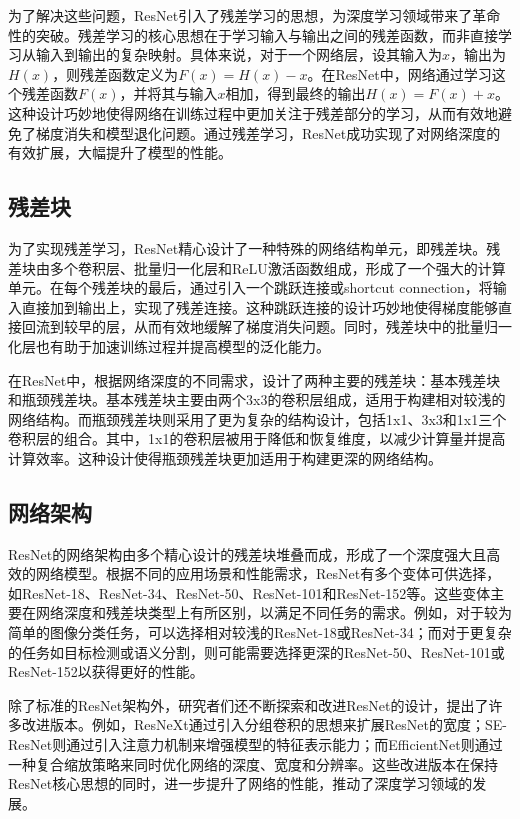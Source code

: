 为了解决这些问题，ResNet引入了残差学习的思想，为深度学习领域带来了革命性的突破。残差学习的核心思想在于学习输入与输出之间的残差函数，而非直接学习从输入到输出的复杂映射。具体来说，对于一个网络层，设其输入为$x$，输出为$H(x)$，则残差函数定义为$F(x) = H(x) - x$。在ResNet中，网络通过学习这个残差函数$F(x)$，并将其与输入$x$相加，得到最终的输出$H(x) = F(x) + x$。这种设计巧妙地使得网络在训练过程中更加关注于残差部分的学习，从而有效地避免了梯度消失和模型退化问题。通过残差学习，ResNet成功实现了对网络深度的有效扩展，大幅提升了模型的性能。

\subsection{残差块}

为了实现残差学习，ResNet精心设计了一种特殊的网络结构单元，即残差块。残差块由多个卷积层、批量归一化层和ReLU激活函数组成，形成了一个强大的计算单元。在每个残差块的最后，通过引入一个跳跃连接或shortcut connection，将输入直接加到输出上，实现了残差连接。这种跳跃连接的设计巧妙地使得梯度能够直接回流到较早的层，从而有效地缓解了梯度消失问题。同时，残差块中的批量归一化层也有助于加速训练过程并提高模型的泛化能力。

在ResNet中，根据网络深度的不同需求，设计了两种主要的残差块：基本残差块和瓶颈残差块。基本残差块主要由两个3x3的卷积层组成，适用于构建相对较浅的网络结构。而瓶颈残差块则采用了更为复杂的结构设计，包括1x1、3x3和1x1三个卷积层的组合。其中，1x1的卷积层被用于降低和恢复维度，以减少计算量并提高计算效率。这种设计使得瓶颈残差块更加适用于构建更深的网络结构。

\subsection{网络架构}

ResNet的网络架构由多个精心设计的残差块堆叠而成，形成了一个深度强大且高效的网络模型。根据不同的应用场景和性能需求，ResNet有多个变体可供选择，如ResNet-18、ResNet-34、ResNet-50、ResNet-101和ResNet-152等。这些变体主要在网络深度和残差块类型上有所区别，以满足不同任务的需求。例如，对于较为简单的图像分类任务，可以选择相对较浅的ResNet-18或ResNet-34；而对于更复杂的任务如目标检测或语义分割，则可能需要选择更深的ResNet-50、ResNet-101或ResNet-152以获得更好的性能。

除了标准的ResNet架构外，研究者们还不断探索和改进ResNet的设计，提出了许多改进版本。例如，ResNeXt通过引入分组卷积的思想来扩展ResNet的宽度；SE-ResNet则通过引入注意力机制来增强模型的特征表示能力；而EfficientNet则通过一种复合缩放策略来同时优化网络的深度、宽度和分辨率。这些改进版本在保持ResNet核心思想的同时，进一步提升了网络的性能，推动了深度学习领域的发展。

